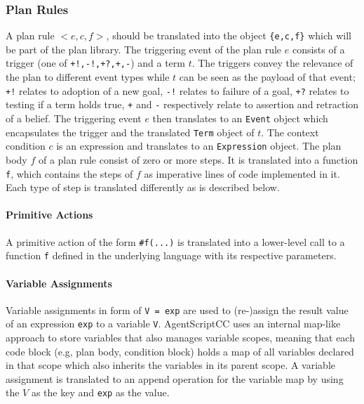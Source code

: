 \subsubsection{Plan Rules}
A plan rule $<e,c,f>$, should be translated into the object \verb+{e,c,f}+ which will be part of the plan library. The triggering event of the plan rule $e$ consists of a trigger (one of \verb#+!,-!,+?,+,-#) and a term $t$. The triggers convey the relevance of the plan to different event types while $t$ can be seen as the payload of that event; \verb#+!# relates to adoption of a new goal, \verb#-!# relates to failure of a goal, \verb#+?# relates to testing if a term holds true, \verb#+# and \verb#-# respectively relate to assertion and retraction of a belief. The triggering event $e$ then translates to an \verb+Event+ object which encapsulates the trigger and the translated \verb+Term+ object of $t$. The context condition $c$ is an expression and translates to an \verb+Expression+ object. The plan body $f$ of a plan rule consist of zero or more steps. %
It is translated into a function \verb+f+, which contains the steps of $f$ as imperative lines of code implemented in it. Each type of step is translated differently as is described below.

\paragraph{Primitive Actions}
A primitive action of the form \verb+#f(...)+ %
is translated into a lower-level call to a function \verb+f+ defined in the underlying language with its respective parameters. %

\paragraph{Variable Assignments}
Variable assignments in form of \verb+V = exp+ are used to (re-)assign the result value of an expression \verb+exp+ to a variable \verb+V+. AgentScriptCC uses an internal map-like approach to store variables that also manages variable scopes, meaning that each code block (e.g, plan body, condition block) holds a map of all variables declared in that scope which also inherits the variables in its parent scope. A variable assignment is translated to an append operation for the variable map by using the $V$ as the key and \verb+exp+ as the value.

